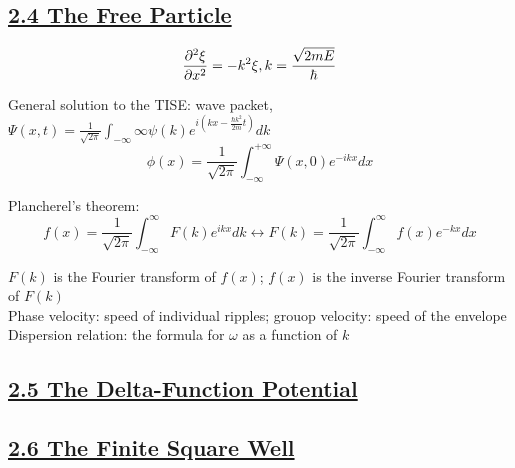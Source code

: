 \subsection{\underline{2.4 The Free Particle}}
$$\pdv[2]{\xi}{x} = -k^2 \xi, k = \frac{\sqrt{2mE}}{\hbar}$$

General solution to the TISE: wave packet, $\Psi(x, t) = \frac{1}{\sqrt{2\pi}} \int_{-\infty}{\infty} \psi(k) e^{i (kx - \frac{\hbar k^2}{2m} t)} dk$ \\
$$\phi(x) = \frac{1}{\sqrt{2 \pi}} \int_{-\infty}^{+\infty} \Psi(x, 0) e^{-ikx} dx$$

Plancherel's theorem: $$f(x) = \frac{1}{\sqrt{2 \pi}} \int_{-\infty}^{\infty} F(k) e^{ikx} dk \leftrightarrow F(k) = \frac{1}{\sqrt{2\pi}} \int_{-\infty}^{\infty} f(x) e^{-kx} dx$$

$F(k)$ is the Fourier transform of $f(x)$; $f(x)$ is the inverse Fourier transform of $F(k)$ \\

Phase velocity: speed of individual ripples; grouop velocity: speed of the envelope \\

Dispersion relation: the formula for $\omega$ as a function of $k$

\subsection{\underline{2.5 The Delta-Function Potential}}

\subsection{\underline{2.6 The Finite Square Well}}


